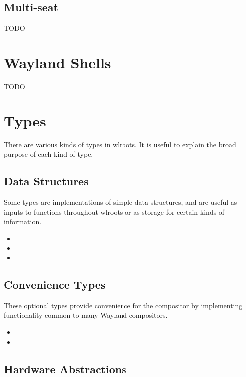 \documentclass{article}
\begin{document}
\subsection{Multi-seat}\label{multi seat}

TODO

\newpage
\section{Wayland Shells}\label{shells}

TODO

\newpage
\section{Types}\label{types}

There are various kinds of types in wlroots. It is useful to explain the broad
purpose of each kind of type.

\subsection{Data Structures}\label{data structures}

Some types are implementations of simple data structures, and are useful as
inputs to functions throughout wlroots or as storage for certain kinds of
information.

\begin{itemize}
    \itemsep0em
    \item {}
    \item {}
    \item {}
\end{itemize}

\subsection{Convenience Types}\label{convenience types}

These optional types provide convenience for the compositor by implementing
functionality common to many Wayland compositors.

\begin{itemize}
    \itemsep0em
    \item {}
    \item {}
\end{itemize}

\subsection{Hardware Abstractions}\label{hardware abstractions}
\end{document}
